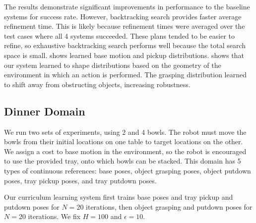 The results demonstrate significant improvements in performance to the baseline systems for success rate.
However, backtracking search provides faster average refinement time. This is likely because
refinement times were averaged over the test cases where all 4 systems succeeded. These plans tended
to be easier to refine, so exhaustive backtracking search performs well because the total search space is small.
 shows learned base motion and pickup distributions.  shows
that our system learned to shape distributions based on the geometry of the environment in which an action
is performed. The grasping distribution learned to shift away from obstructing objects, increasing robustness.


\subsection{Dinner Domain}
We run two sets of experiments, using 2 and 4 bowls. The robot must move the
bowls from their initial locations on one table to target locations on the other. We assign a cost to
base motion in the environment, so the robot is encouraged to use the provided tray, onto which bowls can be stacked.
This domain has 5 types of continuous references: base poses, object grasping poses, object putdown poses, tray pickup
poses, and tray putdown poses.

Our curriculum learning system first trains base poses and tray pickup and putdown poses for
$N = 20$ iterations, then object grasping and putdown poses for $N = 20$ iterations. We fix $H = 100$ and $\epsilon = 10$.

